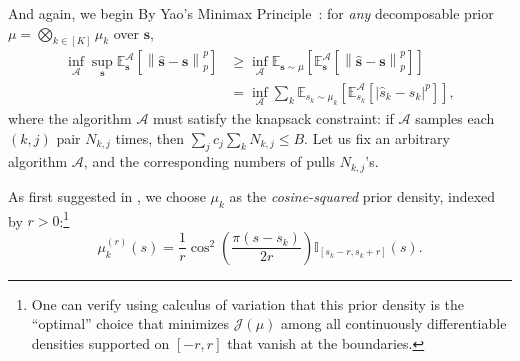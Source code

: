 \documentclass{article}
\def\vs{{\bm{s}}}
\def\gA{{\mathcal{A}}}
\def\gJ{{\mathcal{J}}}
\newcommand{\E}{\mathbb{E}}
\theoremstyle{plain}
\theoremstyle{definition}
\theoremstyle{plain}
\newcommand{\bignorm}[1]{\left\lVert #1 \right\rVert}
\begin{document}
And again, we begin By Yao's Minimax Principle~\citep{yao1977}: for \emph{any} decomposable prior $\mu = \bigotimes_{k \in [K]} \mu_k$ over $\vs$,
\begin{align}
    \inf_{\gA} \sup_{\vs} \E^\gA_{\vs}\left[ \bignorm{\hat{\vs} - \vs}_p^p \right] &\geq \inf_{\gA} \E_{\vs \sim \mu}\left[ \E^\gA_{\vs}\left[ \bignorm{\hat{\vs} - \vs}_p^p \right] \right] \\
    &= \inf_{\gA} \sum_k \E_{s_k \sim \mu_k}\left[ \E^\gA_{s_k}\left[ |\hat{s}_k - s_k|^p \right] \right],
\end{align}
where the algorithm $\gA$ must satisfy the knapsack constraint: if $\gA$ samples each $(k,j)$ pair $N_{k,j}$ times, then $\sum_j c_j \sum_k N_{k,j} \leq B$.
Let us fix an arbitrary algorithm $\gA$, and the corresponding numbers of pulls $N_{k,j}$'s.

As first suggested in \citet{borovkov1998,tsybakov}, we choose $\mu_k$ as the \emph{cosine-squared} prior density, indexed by $r > 0$:\footnote{One can verify using calculus of variation that this prior density is the ``optimal'' choice that minimizes $\gJ(\mu)$ among all continuously differentiable densities supported on $[-r, r]$ that vanish at the boundaries.}
\begin{equation}
    \mu_k^{(r)}(s) = \frac{1}{r} \cos^2\left(\frac{\pi (s - s_k)}{2 r}\right) \mathbb{I}_{[s_k - r, s_k + r]}(s).
\end{equation}
\end{document}
